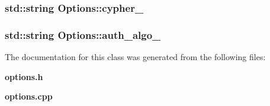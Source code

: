\subsubsection{\setlength{\rightskip}{0pt plus 5cm}std::string {\bf Options::cypher\_\-}\hspace{0.3cm}{\tt  [private]}}\label{classOptions_bba16365a15a6a87c90f85e143bebb5f}


\subsubsection{\setlength{\rightskip}{0pt plus 5cm}std::string {\bf Options::auth\_\-algo\_\-}\hspace{0.3cm}{\tt  [private]}}\label{classOptions_061ed690bdfa12bfc1094ca18293e97a}




The documentation for this class was generated from the following files:\begin{CompactItemize}
\item 
{\bf options.h}\item 
{\bf options.cpp}\end{CompactItemize}

